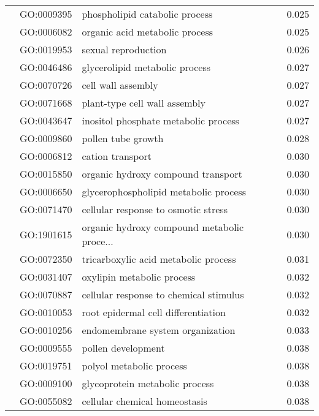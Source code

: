 \begin{longtable}{lllr}
   & GO:0009395 &               phospholipid catabolic process &         0.025 \\
   & GO:0006082 &               organic acid metabolic process &         0.025 \\
   & GO:0019953 &                          sexual reproduction &         0.026 \\
   & GO:0046486 &               glycerolipid metabolic process &         0.027 \\
   & GO:0070726 &                           cell wall assembly &         0.027 \\
   & GO:0071668 &                plant-type cell wall assembly &         0.027 \\
   & GO:0043647 &         inositol phosphate metabolic process &         0.027 \\
   & GO:0009860 &                           pollen tube growth &         0.028 \\
   & GO:0006812 &                             cation transport &         0.030 \\
   & GO:0015850 &           organic hydroxy compound transport &         0.030 \\
   & GO:0006650 &        glycerophospholipid metabolic process &         0.030 \\
   & GO:0071470 &          cellular response to osmotic stress &         0.030 \\
   & GO:1901615 &  organic hydroxy compound metabolic proce... &         0.030 \\
   & GO:0072350 &         tricarboxylic acid metabolic process &         0.031 \\
   & GO:0031407 &                   oxylipin metabolic process &         0.032 \\
   & GO:0070887 &       cellular response to chemical stimulus &         0.032 \\
   & GO:0010053 &          root epidermal cell differentiation &         0.032 \\
   & GO:0010256 &             endomembrane system organization &         0.033 \\
   & GO:0009555 &                           pollen development &         0.038 \\
   & GO:0019751 &                     polyol metabolic process &         0.038 \\
   & GO:0009100 &               glycoprotein metabolic process &         0.038 \\
   & GO:0055082 &                cellular chemical homeostasis &         0.038 \\

\end{longtable}

